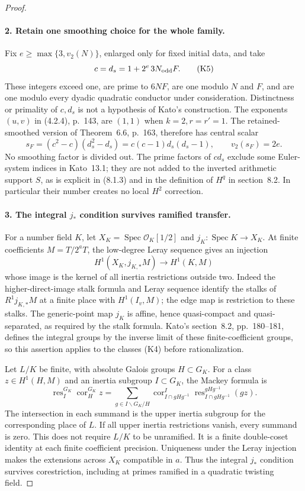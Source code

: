 \begin{proof}
\paragraph{2. Retain one smoothing choice for the whole family.}
Fix $e\geq\max\{3,v_2(N)\}$, enlarged only for fixed initial data,
and take
\[
                 c=d_s=1+2^e\,3N_{\rm odd}F.              \tag{K5}
\]
These integers exceed one, are prime to $6NF$, are one modulo $N$
and $F$, and are one modulo every dyadic quadratic conductor under
consideration. Distinctness or primality of $c,d_s$ is not a
hypothesis of Kato's construction. The exponents $(u,v)$ in (4.2.4),
p.~143, are $(1,1)$ when $k=2,r=r'=1$. The retained-smoothed
version of Theorem~6.6, p.~163, therefore has central scalar
\[
 s_F=(c^2-c)(d_s^2-d_s)=c(c-1)d_s(d_s-1),
                   \qquad v_2(s_F)=2e.                   \tag{K6}
\]
No smoothing factor is divided out. The prime factors of $cd_s$
exclude some Euler-system indices in Kato~13.1; they are not added
to the inverted arithmetic support $S$, as is explicit in (8.1.3)
and in the definition of $H^q$ in section~8.2. In particular their
number creates no local $H^2$ correction.

\paragraph{3. The integral $j_*$ condition survives ramified transfer.}
For a number field $K$, let $X_K=\operatorname{Spec}\mathcal O_K[1/2]$
and $j_K:\operatorname{Spec}K\to X_K$. At finite coefficients
$M=T/2^aT$, the low-degree Leray sequence gives an injection
\[
 H^1(X_K,j_{K,*}M)\longrightarrow H^1(K,M)
\]
whose image is the kernel of all inertia restrictions outside two.
Indeed the higher-direct-image stalk formula and Leray sequence
\cite[Tags 03Q9 and 03QA]{stackscohom} identify the stalks of
$R^1j_{K,*}M$ at a finite place with $H^1(I_v,M)$;
the edge map is restriction to these stalks. The generic-point map
$j_K$ is affine, hence quasi-compact and quasi-separated, as required
by the stalk formula. Kato's section~8.2,
pp.~180--181, defines the integral groups by the inverse limit of
these finite-coefficient groups, so this assertion applies to the
classes (K4) before rationalization.

Let $L/K$ be finite, with absolute Galois groups $H\subset G_K$.
For a class $z\in H^1(H,M)$ and an inertia subgroup $I\subset G_K$,
the Mackey formula is
\[
 \operatorname{res}_{I}^{G_K}\operatorname{cor}_{H}^{G_K}z
 =\sum_{g\in I\backslash G_K/H}
   \operatorname{cor}_{I\cap gHg^{-1}}^{I}
   \operatorname{res}_{I\cap gHg^{-1}}^{gHg^{-1}}(g z).    \tag{K7}
\]
The intersection in each summand is the upper inertia subgroup
for the corresponding place of $L$. If all upper inertia
restrictions vanish, every summand is zero. This does not require
$L/K$ to be unramified. It is a finite double-coset identity at each
finite coefficient precision. Uniqueness under the Leray injection
makes the extensions across $X_K$ compatible in $a$. Thus the
integral $j_*$ condition survives corestriction, including at primes
ramified in a quadratic twisting field.


\end{proof}
